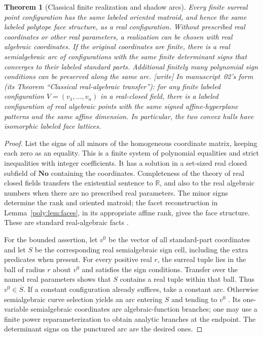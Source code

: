 \documentclass[11pt,a4paper]{article}
\numberwithin{equation}{section}
\newtheorem{theorem}{Theorem}[section]
\theoremstyle{plain}
\newcommand{\wtag}{\textup{[write]}}%
\newcommand{\No}{\mathbf{No}}
\newcommand{\R}{\mathbb R}
\begin{document}
\begin{theorem}[Classical finite realization and shadow arcs]
\label{poly:thm:general}\label{poly:ts:thm:transfer}
Every finite surreal point configuration has the same labeled oriented
matroid, and hence the same labeled polytope face structure, as a real
configuration. Without prescribed real coordinates or other real
parameters, a realization can be chosen with real algebraic coordinates.
If the original coordinates are finite, there is a real semialgebraic arc
of configurations with the same finite determinant signs that converges
to their labeled standard parts. Additional \emph{finitely many} polynomial
sign conditions can be preserved along the same arc.
\wtag{} In manuscript~02's form (its Theorem ``Classical real-algebraic
transfer''): for any finite labeled configuration $V=(v_1,\ldots,v_n)$ in a
real-closed field, there is a labeled configuration of real algebraic points
with the same signed affine-hyperplane patterns and the same affine
dimension. In particular, the two convex hulls have isomorphic labeled face
lattices.
\end{theorem}
\begin{proof}
List the signs of all minors of the homogeneous coordinate matrix, keeping
each zero as an equality. This is a finite system of polynomial equalities
and strict inequalities with integer coefficients. It has a solution in
a set-sized real closed subfield of $\No$ containing the coordinates.
Completeness of the theory of real closed fields transfers the existential
sentence to $\R$, and also to the real algebraic numbers when there are
no prescribed real parameters. The minor signs determine the rank and
oriented matroid; the facet reconstruction in
Lemma~\ref{poly:lem:faces}, in its appropriate affine rank, gives the face
structure. These are standard real-algebraic facts \cite{fs:BPR}.

For the bounded assertion, let $v^0$ be the vector of all standard-part
coordinates and let $S$ be the corresponding real semialgebraic sign cell,
including the extra predicates when present. For every positive real
$r$, the surreal tuple lies in the ball of radius $r$ about $v^0$ and
satisfies the sign conditions. Transfer over the named real parameters
shows that $S$ contains a real tuple within that ball. Thus
$v^0\in\overline S$. If a constant configuration already suffices, take
a constant arc. Otherwise semialgebraic curve selection yields an arc
entering $S$ and tending to $v^0$ \cite{fs:BPR,fs:BR}. Its one-variable
semialgebraic coordinates are algebraic-function branches; one may use
a finite power reparameterization to obtain analytic branches at the
endpoint. The determinant signs on the punctured arc are the desired ones.
\end{proof}
\end{document}
